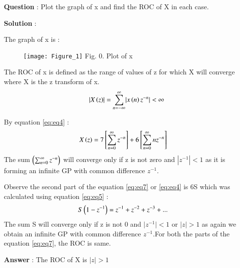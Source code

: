 \documentclass[journal,12pt,twocolumn]{IEEEtran}
\theoremstyle{remark}
\begin{document}
\vspace{4mm}

\large\textbf{Question} : \normalsize Plot the graph of x and find the ROC of X in each case.

\vspace{4mm}
\newpage
\large\textbf{Solution} :

\vspace{4mm}

\large\textbf{} \normalsize The graph of x is :
\begin{figure}[ht]
    \begin{center}
    \texttt{[image: Figure\_1]}
    Fig. 0. Plot of x \\
    \end{center}
\end{figure}

The ROC of x is defined as the range of values of z for which X will converge where X is the z transform of x.\\
\begin{align}
   \lvert X\left(z\right)\rvert = \sum_{n = -\infty}^{\infty}\lvert x\left(n\right)z^{-n}\rvert < \infty
\end{align}

By equation \eqref{eq:eq4} :\\
\begin{align}
X\left(z\right) &=  7{}\left[\sum_{n=0}^{\infty}z^{-n}\right] + 6{}\left[\sum_{n=0}^{\infty}nz^{-n}\right] \label{eq:eq7}
\end{align}
The sum $ \left(\sum_{n=0}^{\infty}z^{-n}\right) $ will converge only if z is not zero and $ |z^{-1}|< 1 $ as it is forming an infinite GP with common difference $z^{-1}$. 

Observe the second part of the equation \eqref{eq:eq7} or \eqref{eq:eq4} is 6S which was calculated using equation \eqref{eq:eq5} : \\
\begin{align}
    S\left(1-z^{-1}\right) &= z^{-1} + z^{-2} + z^{-3} + ... 
\end{align}
The sum S will converge only if z is not 0 and $\lvert z^{-1} \rvert < 1 $ or $ \lvert z \rvert > 1$ as again we obtain an infinite GP with common difference $z^{-1}$.For both the parts of the equation \eqref{eq:eq7}, the ROC is same.

\vspace{4mm}

\large\textbf{Answer} : \normalsize The ROC of X is  $\lvert z \rvert > 1$
\end{document}
